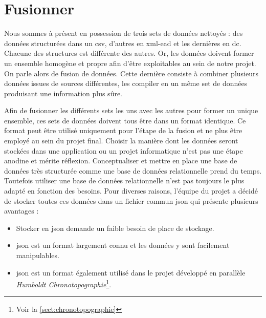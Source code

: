 \documentclass[a4paper, 12pt, twoside]{book}
\begin{document}
\section{Fusionner}
Nous sommes à présent en possession de trois sets de données nettoyés : des données structurées dans un \gls{csv}, d'autres en \gls{xml}-\gls{ead} et les dernières en \gls{dc}. Chacune des structures est différente des autres. Or, les données doivent former un ensemble homogène et propre afin d'être exploitables au sein de notre projet. On parle alors de fusion de données. Cette dernière consiste à combiner plusieurs données issues de sources différentes, les compiler en un même set de données produisant une information plus sûre. 

Afin de fusionner les différents sets les uns avec les autres pour former un unique ensemble, ces sets de données doivent tous être dans un format identique. Ce format peut être utilisé uniquement pour l'étape de la fusion et ne plus être employé au sein du projet final. Choisir la manière dont les données seront stockées dans une application ou un projet informatique n'est pas une étape anodine et mérite réflexion. Conceptualiser et mettre en place une base de données très structurée comme une base de données relationnelle prend du temps. Toutefois utiliser une base de données relationnelle n'est pas toujours le plus adapté en fonction des besoins. Pour diverses raisons, l'équipe du projet a décidé de stocker toutes ces données dans un fichier commun \gls{json} qui présente plusieurs avantages :
\begin{itemize}
    \item Stocker en \gls{json} demande un faible besoin de place de stockage.
    \item \gls{json} est un format largement connu et les données y sont facilement manipulables.
    \item \gls{json} est un format également utilisé dans le projet développé en parallèle \textit{Humboldt Chronotopographie}\footnote{Voir la \autoref{sect:chronotopographie}}.
\end{itemize}
\end{document}
